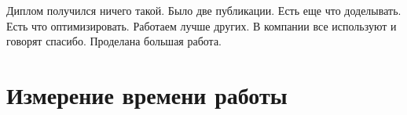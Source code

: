 
\startconclusionpage
Диплом получился ничего такой.
Было две публикации.
Есть еще что доделывать.
Есть что оптимизировать.
Работаем лучше других.
В компании все используют и говорят спасибо.
Проделана большая работа.

\printmainbibliography

\appendix

\chapter{Измерение времени работы}
